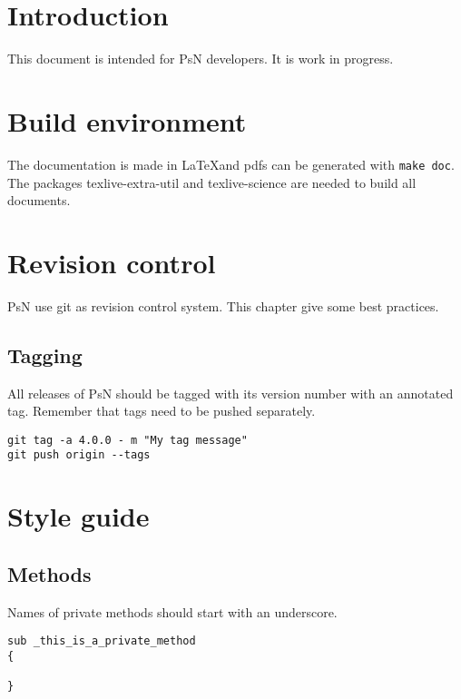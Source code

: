 



\maketitle

  
\section{Introduction}

This document is intended for PsN developers. It is work in progress.

\section{Build environment}
The documentation is made in \LaTeX and pdfs can be generated with \verb|make doc|. The
packages texlive-extra-util and texlive-science are needed to build all documents.

\section{Revision control}
PsN use git as revision control system. This chapter give some best practices.

\subsection{Tagging}
All releases of PsN should be tagged with its version number with an annotated tag. Remember
that tags need to be pushed separately.
\begin{verbatim}
git tag -a 4.0.0 - m "My tag message"
git push origin --tags
\end{verbatim}

\section{Style guide}

\subsection{Methods}

Names of private methods should start with an underscore.
\begin{verbatim}
sub _this_is_a_private_method
{

}
\end{verbatim}


